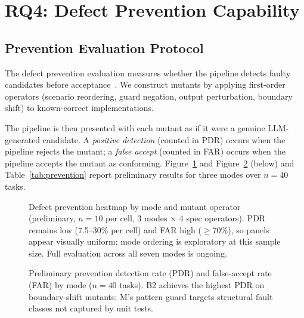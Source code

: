 \section{RQ4: Defect Prevention Capability}
\label{sec:exp:rq4}

\subsection{Prevention Evaluation Protocol}

The defect prevention evaluation measures whether the pipeline detects faulty
candidates before acceptance~\citep{li2023iet,demillo1978mutation}.  We construct mutants by applying
first-order operators (scenario reordering, guard negation, output perturbation,
boundary shift) to known-correct implementations.

The pipeline is then presented with each mutant as if it were a genuine LLM-generated
candidate.  A \emph{positive detection} (counted in PDR) occurs when the pipeline
rejects the mutant; a \emph{false accept} (counted in FAR) occurs when the pipeline
accepts the mutant as conforming.
Figure~\ref{fig:prevention-heatmap} and Figure~\ref{fig:prevention-bar} (below) and
Table~\ref{tab:prevention} report preliminary results for three modes over $n = 40$ tasks.

\begin{figure}[t]
  \centering
  \caption{Defect prevention heatmap by mode and mutant operator (preliminary,
    $n=10$ per cell, 3 modes $\times$ 4 spec operators).
    PDR remains low (7.5--30\% per cell) and FAR high ($\geq$70\%), so panels
    appear visually uniform; mode ordering is exploratory at this sample size.
    Full evaluation across all seven modes is ongoing.}
  \label{fig:prevention-heatmap}
\end{figure}

\begin{figure}[t]
  \centering
  \caption{Preliminary prevention detection rate (PDR) and false-accept rate (FAR) by
    mode ($n=40$ tasks).  B2 achieves the highest PDR on boundary-shift mutants;
    M's pattern guard targets structural fault classes not captured by unit tests.}
  \label{fig:prevention-bar}
\end{figure}

